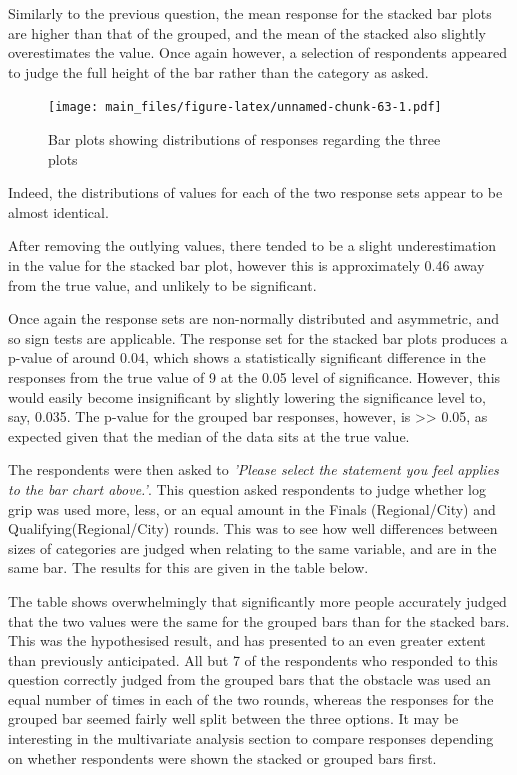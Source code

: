\documentclass[
  11pt,
]{book}
\begin{document}
Similarly to the previous question, the mean response for the stacked
bar plots are higher than that of the grouped, and the mean of the
stacked also slightly overestimates the value. Once again however, a
selection of respondents appeared to judge the full height of the bar
rather than the category as asked.

\begin{figure}
\centering
\texttt{[image: main\_files/figure-latex/unnamed-chunk-63-1.pdf]}
\caption{Bar plots showing distributions of responses regarding the
three plots}
\end{figure}

Indeed, the distributions of values for each of the two response sets
appear to be almost identical.

After removing the outlying values, there tended to be a slight
underestimation in the value for the stacked bar plot, however this is
approximately 0.46 away from the true value, and unlikely to be
significant.

Once again the response sets are non-normally distributed and
asymmetric, and so sign tests are applicable. The response set for the
stacked bar plots produces a p-value of around 0.04, which shows a
statistically significant difference in the responses from the true
value of 9 at the 0.05 level of significance. However, this would easily
become insignificant by slightly lowering the significance level to,
say, 0.035. The p-value for the grouped bar responses, however, is
\textgreater\textgreater{} 0.05, as expected given that the median of
the data sits at the true value.

The respondents were then asked to
\textit{'Please select the statement you feel applies to the bar chart above.'}.
This question asked respondents to judge whether log grip was used more,
less, or an equal amount in the Finals (Regional/City) and
Qualifying(Regional/City) rounds. This was to see how well differences
between sizes of categories are judged when relating to the same
variable, and are in the same bar. The results for this are given in the
table below.

The table shows overwhelmingly that significantly more people accurately
judged that the two values were the same for the grouped bars than for
the stacked bars. This was the hypothesised result, and has presented to
an even greater extent than previously anticipated. All but 7 of the
respondents who responded to this question correctly judged from the
grouped bars that the obstacle was used an equal number of times in each
of the two rounds, whereas the responses for the grouped bar seemed
fairly well split between the three options. It may be interesting in
the multivariate analysis section to compare responses depending on
whether respondents were shown the stacked or grouped bars first.
\end{document}
